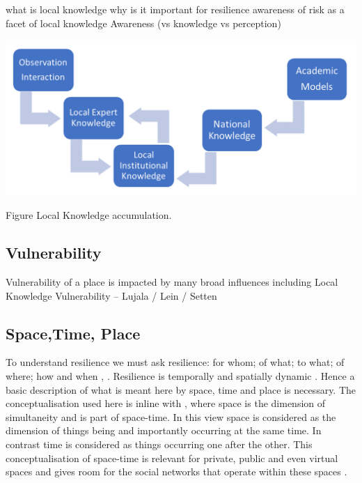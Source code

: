 \documentclass{article}
\begin{document}
what is local knowledge
why is it important for resilience
awareness of risk as a facet of local knowledge 
 Awareness (vs knowledge vs perception)

\includegraphics[width=1\textwidth]{fig_theory/local knowledge accumulation.png}

\begin{frame}{Figure Local Knowledge accumulation.}
\end{frame}
 
\subsection{Vulnerability}
Vulnerability of a place is impacted by many broad influences including Local Knowledge 
Vulnerability – Lujala / Lein / Setten 



\subsection{Space,Time, Place} 
To understand resilience we must ask resilience: for whom; of what; to what; of where; how and when \cite{cutter_community_2020}, \cite{moser_turbulent_2019}. Resilience is temporally and spatially dynamic \cite{cutter_community_2020}. Hence a basic description of what is meant here by space, time and place is necessary. The conceptualisation used here is inline with \cite{massey_for_2005}, where space is the dimension of simultaneity and is part of space-time. In this view space is considered as the dimension of things being and importantly occurring at the same time. In contrast time is considered as things occurring one after the other. This conceptualisation of space-time is relevant for private, public and even virtual spaces and gives room for the social networks that operate within these spaces \cite{massey_for_2005} \cite{allen_rethinking_1998}.
\end{document}
